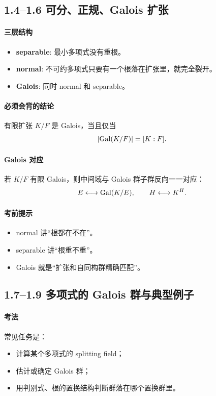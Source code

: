 \documentclass[a4paper]{ctexart}
\begin{document}
\subsection{1.4--1.6 可分、正规、Galois 扩张}

\paragraph{三层结构}
\begin{itemize}
  \item \textbf{separable}: 最小多项式没有重根。
  \item \textbf{normal}: 不可约多项式只要有一个根落在扩张里，就完全裂开。
  \item \textbf{Galois}: 同时 normal 和 separable。
\end{itemize}

\paragraph{必须会背的结论}
有限扩张 \(K/F\) 是 Galois，当且仅当
\[
|{\rm Gal}(K/F)|=[K:F].
\]

\paragraph{Galois 对应}
若 \(K/F\) 有限 Galois，则中间域与 Galois 群子群反向一一对应：
\[
E \longleftrightarrow {\rm Gal}(K/E),\qquad
H \longleftrightarrow K^H.
\]

\paragraph{考前提示}
\begin{itemize}
  \item normal 讲“根都在不在”。
  \item separable 讲“根重不重”。
  \item Galois 就是“扩张和自同构群精确匹配”。
\end{itemize}

\subsection{1.7--1.9 多项式的 Galois 群与典型例子}

\paragraph{考法}
常见任务是：
\begin{itemize}
  \item 计算某个多项式的 splitting field；
  \item 估计或确定 Galois 群；
  \item 用判别式、根的置换结构判断群落在哪个置换群里。
\end{itemize}
\end{document}
